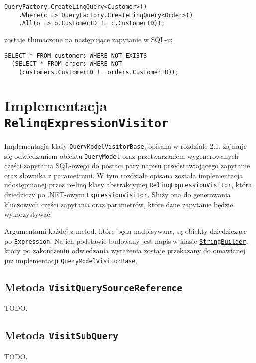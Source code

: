 \begin{enumerate}[a)]
\begin{lstlisting}
QueryFactory.CreateLinqQuery<Customer>()
    .Where(c => QueryFactory.CreateLinqQuery<Order>()
    .All(o => o.CustomerID != c.CustomerID));
\end{lstlisting}

zostaje tłumaczone na następujące zapytanie w SQL-u:

\begin{lstlisting}
SELECT * FROM customers WHERE NOT EXISTS 
  (SELECT * FROM orders WHERE NOT
    (customers.CustomerID != orders.CustomerID));
\end{lstlisting}

\end{enumerate}

\section{Implementacja \texttt{RelinqExpressionVisitor}}
Implementacja klasy \texttt{QueryModelVisitorBase}, opisana w rozdziale 2.1, zajmuje się odwiedzaniem obiektu \texttt{QueryModel} oraz przetwarzaniem wygenerowanych części zapytania SQL-owego do postaci pary napisu przedstawiającego zapytanie oraz słownika z parametrami. W tym rozdziale opisana została implementacja udostępnianej przez re-linq klasy abstrakcyjnej \href{https://github.com/re-motion/Relinq/blob/82fdca6a4bfd942bb4a71dd20ab9c5af0aea0541/Core/Parsing/RelinqExpressionVisitor.cs}{\texttt{RelinqExpressionVisitor}}, która dziedziczy po .NET-owym \href{https://msdn.microsoft.com/en-us/library/system.linq.expressions.expressionvisitor(v=vs.110).aspx}{\texttt{ExpressionVisitor}}. Służy ona do generowania kluczowych części zapytania oraz parametrów, które dane zapytanie będzie wykorzystywać.

Argumentami każdej z metod, które będą nadpisywane, są obiekty dziedziczące po \texttt{Expression}. Na ich podstawie budowany jest napis w klasie \href{https://msdn.microsoft.com/pl-pl/library/system.text.stringbuilder(v=vs.110).aspx}{\texttt{StringBuilder}}, który po zakończeniu odwiedzania wyrażenia zostaje przekazany do omawianej już implementacji \texttt{QueryModelVisitorBase}.

\subsection{Metoda \texttt{VisitQuerySourceReference}}
TODO.

\subsection{Metoda \texttt{VisitSubQuery}}
TODO.

